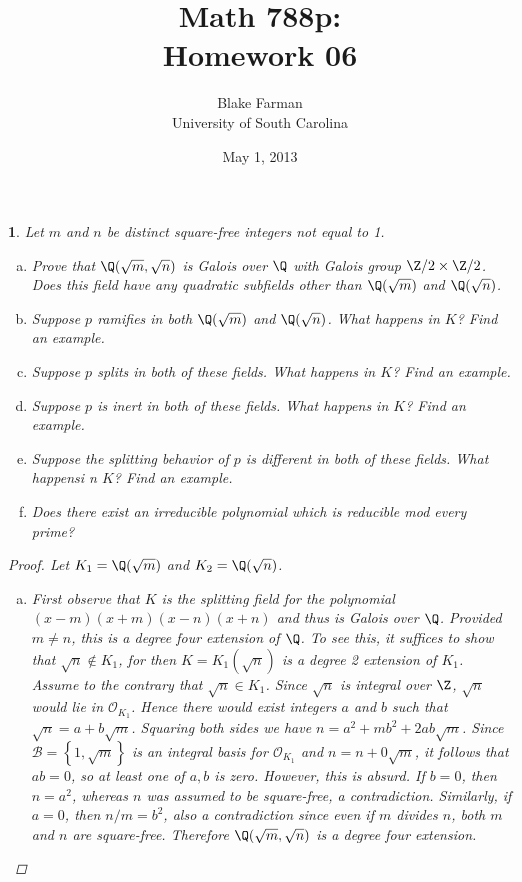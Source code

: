\documentclass[10pt]{amsart}
\author{Blake Farman\\University of South Carolina}
\title{Math 788p:\\Homework 06}
\date{May 1, 2013}
\begin{document}
\maketitle

\providecommand{\p}{\mathfrak{p}}
\providecommand{\m}{\mathfrak{m}}
\newcommand{\legendre}[2]{\left(\frac{#1}{#2}\right)}
\theoremstyle{plain}
\newtheorem{thm}{}
\newtheorem{lem}{Lemma}
\theoremstyle{definition}
\newtheorem{defn}{Definition}

\setcounter{thm}{7}

\begin{thm}
  Let $m$ and $n$ be distinct square-free integers not equal to 1.
  
  \begin{enumerate}[(a)]
  \item
    Prove that $\Q(\sqrt{m}, \sqrt{n})$ is Galois over $\Q$ with Galois group $\Z/2 \times \Z/2$.
    Does this field have any quadratic subfields other than $\Q(\sqrt{m})$ and $\Q(\sqrt{n})$.
  \item
    Suppose $p$ ramifies in both $\Q(\sqrt{m})$ and $\Q(\sqrt{n})$.
    What happens in $K$?
    Find an example.
  \item
    Suppose $p$ splits in both of these fields.
    What happens in $K$?
    Find an example.
  \item
    Suppose $p$ is inert in both of these fields.
    What happens in $K$?
    Find an example.
  \item
    Suppose the splitting behavior of $p$ is different in both of these fields.
    What happensi n $K$?
    Find an example.
  \item
    Does there exist an irreducible polynomial which is reducible mod every prime?
  \end{enumerate}
  
  \begin{proof}
    Let $K_1 = \Q(\sqrt{m})$ and $K_2 = \Q(\sqrt{n})$.
    \begin{enumerate}[(a)]
      \item
        First observe that $K$ is the splitting field for the polynomial $(x - m)(x + m)(x - n)(x + n)$ and thus is Galois over $\Q$.
        Provided $m \neq n$, this is a degree four extension of $\Q$.
        To see this, it suffices to show that $\sqrt{n} \not \in K_1$, for then $K = K_1(\sqrt{n})$ is a degree 2 extension of $K_1$.
        Assume to the contrary that $\sqrt{n} \in K_1$.
        Since $\sqrt{n}$ is integral over $\Z$, $\sqrt{n}$ would lie in $\mathcal{O}_{K_1}$.
        Hence there would exist integers $a$ and $b$ such that $\sqrt{n} = a + b\sqrt{m}$.
        Squaring both sides we have $n = a^2 + mb^2 + 2ab\sqrt{m}$.
        Since $\mathcal{B} = \left\{1, \sqrt{m}\right\}$ is an integral basis for $\mathcal{O}_{K_1}$ and $n = n + 0\sqrt{m}$, it follows that $ab = 0$, so at least one of $a,b$ is zero.
        However, this is absurd.
        If $b = 0$, then $n = a^2$, whereas $n$ was assumed to be square-free, a contradiction.
        Similarly, if $a = 0$, then $n/m = b^2$, also a contradiction since even if $m$ divides $n$, both $m$ and $n$ are square-free.
        Therefore $\Q(\sqrt{m}, \sqrt{n})$ is a degree four extension.
        

\end{enumerate}
\end{proof}
\end{thm}
\end{document}
